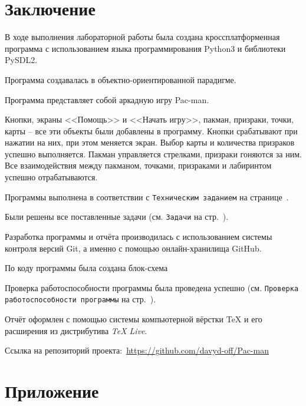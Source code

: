 \documentclass[14pt, oneside]{altsu-report}
\begin{document}

 

\chapter*{Заключение}
В ходе выполнения лабораторной работы была создана кроссплатформенная программа с использованием языка программирования Python3 и библиотеки PySDL2.

Программа создавалась в объектно-ориентированной парадигме.

Программа представляет собой аркадную игру Pac-man.

Кнопки, экраны <<Помощь>> и <<Начать игру>>, пакман, призраки, точки, карты -- все эти объекты были добавлены в программу. Кнопки срабатывают при нажатии на них, при этом меняется экран. Выбор карты и количества призраков успешно выполняется. Пакман управляется стрелками, призраки гоняются за ним. Все взаимодействия между пакманом, точками, призраками и лабиринтом успешно отрабатываются. 

Программы выполнена в соответствии с \texttt{Техническим заданием} на странице~\pageref{sec:ch01/sec01}.

Были решены все поставленные задачи (см. \texttt{Задачи} на стр.~\pageref{zadachi}).

Разработка программы и отчёта производилась с использованием системы контроля версий Git, а именно с помощью онлайн-хранилища GitHub.

По коду программы была создана блок-схема %

Проверка работоспособности программы была проведена успешно (см. \texttt{Проверка работоспособности программы} на стр.~\pageref{sec:ch02/sec02}).

Отчёт оформлен с помощью системы компьютерной вёрстки \TeX{} и его расширения \XeTeX{} из дистрибутива \textit{TeX Live}.

Ссылка на репозиторий проекта:~\textcolor{blue}{\url{https://github.com/davyd-off/Pac-man}}

\newpage
{}
\printbibliography[title={Список использованной литературы}]

\appendix
\newpage
\chapter*{\raggedleft\label{appendix1}Приложение}
\end{document}
